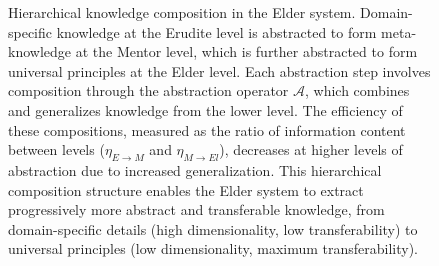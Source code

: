\begin{figure}[t]
\caption{Hierarchical knowledge composition in the Elder system. Domain-specific knowledge at the Erudite level is abstracted to form meta-knowledge at the Mentor level, which is further abstracted to form universal principles at the Elder level. Each abstraction step involves composition through the abstraction operator $\mathcal{A}$, which combines and generalizes knowledge from the lower level. The efficiency of these compositions, measured as the ratio of information content between levels ($\eta_{E \rightarrow M}$ and $\eta_{M \rightarrow El}$), decreases at higher levels of abstraction due to increased generalization. This hierarchical composition structure enables the Elder system to extract progressively more abstract and transferable knowledge, from domain-specific details (high dimensionality, low transferability) to universal principles (low dimensionality, maximum transferability).}
\label{fig:hierarchical_composition}
\end{figure}